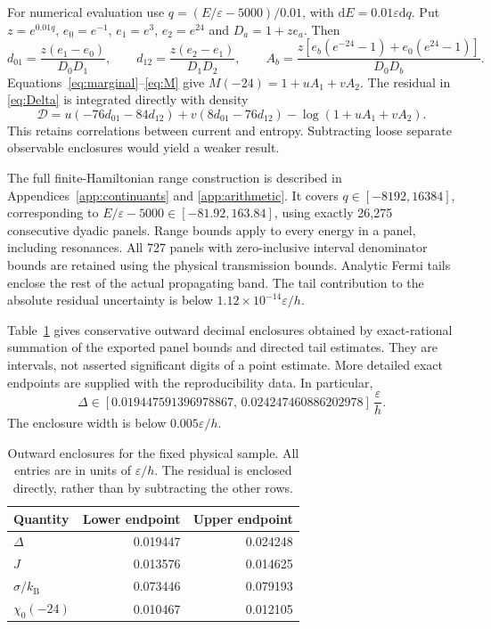 \documentclass[11pt,a4paper]{article}
\newcommand{\kb}{k_{\mathrm B}}
\newcommand{\ee}{\varepsilon}
\newcommand{\dd}{\mathrm d}
\begin{document}
For numerical evaluation use $q=(E/\ee-5000)/0.01$, with $\dd E=0.01\ee\dd q$.
Put $z=e^{0.01q}$, $e_0=e^{-1}$, $e_1=e^3$, $e_2=e^{24}$ and
$D_a=1+ze_a$. Then
\begin{equation}
 d_{01}=\frac{z(e_1-e_0)}{D_0D_1},\qquad
 d_{12}=\frac{z(e_2-e_1)}{D_1D_2},\qquad
 A_b=\frac{z[e_b(e^{-24}-1)+e_0(e^{24}-1)]}{D_0D_b}.
 \label{eq:densities}
\end{equation}
Equations~\eqref{eq:marginal}--\eqref{eq:M} give
$M(-24)=1+uA_1+vA_2$. The residual in \eqref{eq:Delta} is integrated
directly with density
\begin{equation}
 \mathcal D=u(-76d_{01}-84d_{12})
             +v(8d_{01}-76d_{12})-\log(1+uA_1+vA_2).
 \label{eq:residualdensity}
\end{equation}
This retains correlations between current and entropy. Subtracting loose
separate observable enclosures would yield a weaker result.

The full finite-Hamiltonian range construction is described in
Appendices~\ref{app:continuants} and \ref{app:arithmetic}. It covers
$q\in[-8192,16384]$, corresponding to
$E/\ee-5000\in[-81.92,163.84]$, using exactly 26,275 consecutive dyadic
panels. Range bounds apply to every energy in a panel, including resonances.
All 727 panels with zero-inclusive interval denominator bounds are retained
using the physical transmission bounds. Analytic Fermi tails enclose the
rest of the actual propagating band. The tail contribution to the absolute
residual uncertainty is below $1.12\times10^{-14}\ee/h$.

Table~\ref{tab:certificate} gives conservative outward decimal enclosures
obtained by exact-rational summation of the exported panel bounds and
directed tail estimates. They are intervals, not asserted significant digits
of a point estimate. More detailed exact endpoints are supplied with the
reproducibility data. In particular,
\begin{equation}
 \Delta\in[0.019447591396978867,\,0.024247460886202978]\,\frac{\ee}{h}.
 \label{eq:certifiedDelta}
\end{equation}
The enclosure width is below $0.005\ee/h$.

\begin{table}[t]
\centering
\caption{Outward enclosures for the fixed physical sample. All entries are
in units of $\ee/h$. The residual is enclosed directly, rather than by
subtracting the other rows.}
\label{tab:certificate}
\begin{tabular}{lrr}
\toprule
Quantity & Lower endpoint & Upper endpoint\\
\midrule
$\Delta$       & 0.019447 & 0.024248\\
$J$            & 0.013576 & 0.014625\\
$\sigma/\kb$   & 0.073446 & 0.079193\\
$\chi_0(-24)$  & 0.010467 & 0.012105\\
\bottomrule
\end{tabular}
\end{table}
\end{document}
